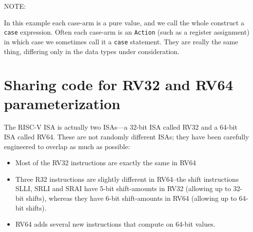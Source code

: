 
\vspace{1ex}

NOTE: 

\vspace{1ex}


In this example each case-arm is a pure value, and we call the whole
construct a \verb|case| expression.  Often each case-arm is an
\verb|Action| (such as a register assignment) in which case we
sometimes call it a \verb|case| statement.  They are really the same
thing, differing only in the data types under consideration.


\section{Sharing code for RV32 and RV64 {\via} parameterization}

\label{BSV_Paramterizing_XLEN}


The RISC-V ISA is actually two ISAs---a 32-bit ISA called RV32 and a
64-bit ISA called RV64.  These are not randomly different ISAs; they
have been carefully engineered to overlap as much as possible:

\begin{itemize}

\item Most of the RV32 instructions are exactly the same in RV64

\item Three R32 instructions are slightly different in RV64--the shift
instructions SLLI, SRLI and SRAI have 5-bit shift-amounts in RV32
(allowing up to 32-bit shifts), whereas they have 6-bit shift-amounts
in RV64 (allowing up to 64-bit shifts).

\item RV64 adds several new instructions that compute on 64-bit values.

\end{itemize}

